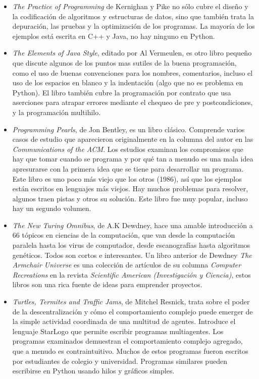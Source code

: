 \begin{itemize}

\item {\em The Practice of Programming} de Kernighan y Pike no sólo
cubre el diseño y la codificación de algoritmos y estructuras de datos,
sino que también trata la depuración, las pruebas y la optimización
de los programas. La mayoría de los ejemplos está escrita en  C++ y
 Java, no hay ninguno en Python.

\item {\em The Elements of Java Style}, editado por Al Vermeulen, es 
otro libro pequeño que discute algunos de los puntos mas sutiles
de la buena programación, como el uso de buenas convenciones para
los nombres, comentarios, incluso el uso de los espacios en blanco
y la indentación (algo que no es problema en Python). El libro
también cubre la programación por contrato que usa aserciones para
atrapar errores mediante el chequeo de pre y postcondiciones, y la
programación multihilo.

\item {\em Programming Pearls}, de Jon Bentley,  es un libro clásico.
Comprende varios casos de estudio que aparecieron originalmente
en la columna del autor en las  {\em Communications of the ACM}.  Los
estudios examinan los compromisos que hay que tomar cuando se programa
y por qué tan a menudo es una mala idea apresurarse con la primera
idea que se tiene para desarrollar un programa. Este libro es uno poco más 
viejo que los otros (1986), así que los ejemplos están escritos en lenguajes
más viejos. Hay muchos problemas para resolver, algunos traen pistas 
y otros su solución. Este libro fue muy popular, incluso hay un 
segundo volumen.

\item {\em The New Turing Omnibus}, de A.K Dewdney, hace una amable
introducción a 66 tópicos en ciencias de la computación, que
van desde la computación paralela hasta los virus de computador,
desde escanografías hasta algoritmos genéticos. Todos son cortos
e interesantes. Un libro anterior de  Dewdney {\em The Armchair Universe}
es una colección de artículos de su columna {\em Computer Recreations} en 
la revista {\em Scientific American (Investigación y Ciencia)},
estos libros son una rica fuente de ideas para emprender proyectos.

\item {\em Turtles, Termites and Traffic Jams}, de Mitchel Resnick,
trata sobre el poder de la descentralización y cómo el comportamiento
complejo puede emerger de la simple actividad coordinada de una multitud
de agentes. Introduce el lenguaje StarLogo que permite escribir
programas multiagentes. Los programas examinados demuestran el
comportamiento complejo agregado, que a menudo es contraintuitivo. 
Muchos de estos programas fueron escritos por estudiantes de colegio
y universidad. Programas similares pueden escribirse en Python
usando hilos y gráficos simples.


\end{itemize}
